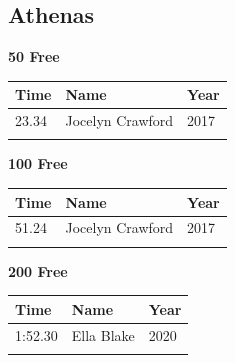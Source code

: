 
\clearpage
{}

\clearpage
\subsection{Athenas}
\vspace{1.2em}
\noindent\begin{minipage}[t]{0.48\textwidth}
\centering
\textbf{\textcolor{teamprimary}{50 Free}}\par
\vspace{0.5em}
\centering
\small
\renewcommand{\arraystretch}{1.0}
\setlength{\tabcolsep}{4pt}
\begin{tabular}{@{}p{1.8cm}p{3.0cm}p{1.0cm}@{}}
\toprule
\textbf{Time} & \textbf{Name} & \textbf{Year} \\
\midrule
23.34 & Jocelyn Crawford & 2017 \\
\bottomrule
\vspace{0.5em}
\end{tabular}
\end{minipage}
\hfill
\begin{minipage}[t]{0.48\textwidth}
\centering
\textbf{\textcolor{teamprimary}{100 Free}}\par
\vspace{0.5em}
\centering
\small
\renewcommand{\arraystretch}{1.0}
\setlength{\tabcolsep}{4pt}
\begin{tabular}{@{}p{1.8cm}p{3.0cm}p{1.0cm}@{}}
\toprule
\textbf{Time} & \textbf{Name} & \textbf{Year} \\
\midrule
51.24 & Jocelyn Crawford & 2017 \\
\bottomrule
\vspace{0.5em}
\end{tabular}
\end{minipage}
\vspace{0.3em}
\vspace{1.2em}
\noindent\begin{minipage}[t]{0.48\textwidth}
\centering
\textbf{\textcolor{teamprimary}{200 Free}}\par
\vspace{0.5em}
\centering
\small
\renewcommand{\arraystretch}{1.0}
\setlength{\tabcolsep}{4pt}
\begin{tabular}{@{}p{1.8cm}p{3.0cm}p{1.0cm}@{}}
\toprule
\textbf{Time} & \textbf{Name} & \textbf{Year} \\
\midrule
1:52.30 & Ella Blake & 2020 \\
\bottomrule
\vspace{0.5em}
\end{tabular}
\end{minipage}
